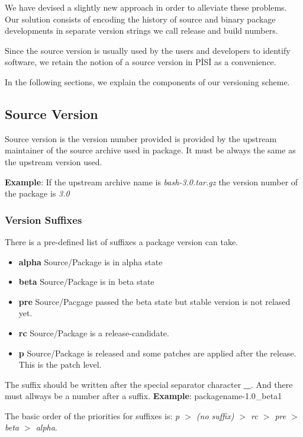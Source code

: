 \documentclass[a4paper,11pt]{article}
\begin{document}
We have devised a slightly new approach in order to alleviate these
problems. Our solution consists of encoding the history of source and
binary package developments in separate version strings we call release and
build numbers.

Since the source version is usually used by the users and developers
to identify software, we retain the notion of a source version in
P\.IS\.I as a convenience. 

In the following sections, we explain the components of our
versioning scheme.

\subsection{Source Version}

Source version is the version number provided is provided by the
upstream maintainer of the source archive used in package. It must be
always the same as the upstream version used.

\textbf{Example}: If the upstream archive name is
\emph{bash-3.0.tar.gz} the version number of the package is \emph{3.0}

\subsubsection{Version Suffixes}

There is a pre-defined list of suffixes a package version can
take.

\begin{itemize}
  \item \textbf{alpha} Source/Package is in alpha state
  \item \textbf{beta} Source/Package is in beta state
  \item \textbf{pre} Source/Pacgage passed the beta state but stable
    version is not relased yet.
  \item \textbf{rc} Source/Package is a release-candidate.
  \item \textbf{p} Source/Package is released and some patches are
    applied after the release. This is the patch level.
\end{itemize}

The suffix should be written after the special separator
character \textbf{\_}. And there must allways be a number after a
suffix. \textbf{Example}: packagename-1.0\_beta1

The basic order of the priorities for suffixes is:\newline
\emph{p $>$ (no suffix) $>$ rc $>$ pre $>$ beta $>$ alpha}.
\end{document}
